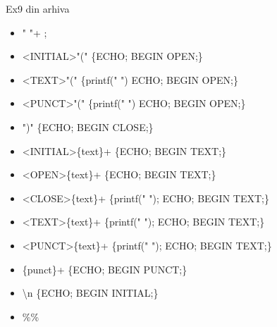 \documentclass[pdf]{beamer}
\begin{document}
\begin{frame}{Ex9 din arhiva}
\begin{itemize}
\item[]
" "+ \hspace{40mm} ;
\item[]
\textless  INITIAL>"(" \hspace{5mm} \{ECHO; BEGIN OPEN;\}
\item[]
\textless  TEXT>"(" \hspace{5mm} \{printf(" ") ECHO; BEGIN OPEN;\}
\item[]
\textless  PUNCT>"(" \hspace{5mm} \{printf(" ") ECHO; BEGIN OPEN;\}
\item[]
")" \hspace{5mm} \{ECHO; BEGIN CLOSE;\}
\item[]
\textless INITIAL>\{text\}+ \hspace{5mm} \{ECHO; BEGIN TEXT;\}
\item[]
\textless OPEN>\{text\}+ \hspace{5mm} \{ECHO; BEGIN TEXT;\}
 \item[]
\textless CLOSE>\{text\}+ \hspace{5mm} \{printf(" "); ECHO; BEGIN TEXT;\}
\item[]
\textless TEXT>\{text\}+ \hspace{5mm} \{printf(" "); ECHO; BEGIN TEXT;\}
\item[]
\textless PUNCT>\{text\}+ \hspace{5mm} \{printf(" "); ECHO; BEGIN TEXT;\}
\item[]
\{punct\}+ \hspace{5mm} \{ECHO; BEGIN PUNCT;\}
\item[]
\textbackslash n \hspace{5mm} \{ECHO; BEGIN INITIAL;\}
\item[]
\%\%
\end{itemize}
\end{frame}
\end{document}

